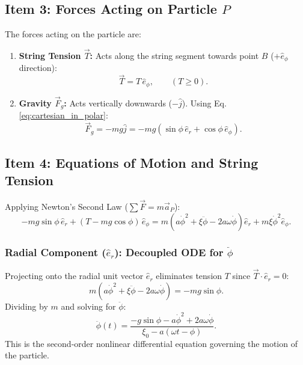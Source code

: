 \documentclass[11pt,a4paper]{article}
\begin{document}
\subsection{Item 3: Forces Acting on Particle $P$}
The forces acting on the particle are:
\begin{enumerate}
    \item \textbf{String Tension $\vec{T}$:} Acts along the string segment towards point $B$ ($+\hat{e}_\phi$ direction):
    \begin{equation}
        \label{eq:force_T}
        \vec{T} = T\,\hat{e}_\phi, \qquad (T \ge 0).
    \end{equation}
    \item \textbf{Gravity $\vec{F}_g$:} Acts vertically downwards ($-\hat{j}$). Using Eq. \eqref{eq:cartesian_in_polar}:
    \begin{equation}
        \label{eq:force_g}
        \vec{F}_g = -mg\hat{j} = -mg\left(\sin\phi\,\hat{e}_r + \cos\phi\,\hat{e}_\phi\right).
    \end{equation}
\end{enumerate}

\subsection{Item 4: Equations of Motion and String Tension}
Applying Newton's Second Law ($\sum \vec{F} = m\vec{a}_P$):
\begin{equation}
    -mg\sin\phi\,\hat{e}_r + (T - mg\cos\phi)\,\hat{e}_\phi = m\left(a\dot{\phi}^2 + \xi\ddot{\phi} - 2a\omega\dot{\phi}\right)\hat{e}_r + m\xi\dot{\phi}^2\hat{e}_\phi.
\end{equation}

\subsubsection{Radial Component ($\hat{e}_r$): Decoupled ODE for $\ddot{\phi}$}
Projecting onto the radial unit vector $\hat{e}_r$ eliminates tension $T$ since $\vec{T} \cdot \hat{e}_r = 0$:
\begin{equation}
    m\left(a\dot{\phi}^2 + \xi\ddot{\phi} - 2a\omega\dot{\phi}\right) = -mg\sin\phi.
\end{equation}
Dividing by $m$ and solving for $\ddot{\phi}$:
\begin{equation}
    \label{eq:ode_phi_final}
    \ddot{\phi}(t) = \frac{-g\sin\phi - a\dot{\phi}^2 + 2a\omega\dot{\phi}}{\xi_0 - a(\omega t - \phi)}.
\end{equation}
This is the second-order nonlinear differential equation governing the motion of the particle.
\end{document}
